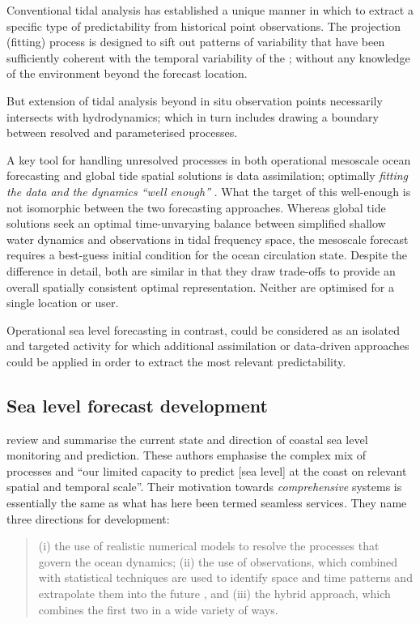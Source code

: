 Conventional tidal analysis has established a unique manner in which to extract a specific type of predictability from historical point observations.
The projection (fitting) process is designed to sift out patterns of variability that have been sufficiently coherent with the temporal variability of the \ATGP{}; without any knowledge of the environment beyond the forecast location.

But extension of tidal analysis beyond in situ observation points necessarily intersects with hydrodynamics; which in turn includes drawing a boundary between resolved and parameterised processes.  

A key tool for handling unresolved processes in both operational mesoscale ocean forecasting and global tide spatial solutions is data assimilation; optimally \textit{fitting the data and the dynamics ``well enough''} \citep{Egbert:1994wz}. 
What the target of this well-enough is not isomorphic between the two forecasting approaches.
Whereas global tide solutions seek an optimal time-unvarying balance between simplified shallow water dynamics and observations in tidal frequency space, the mesoscale forecast requires a best-guess initial condition for the ocean circulation state.  
Despite the difference in detail, both are similar in that they draw trade-offs to provide an overall spatially consistent optimal representation.   Neither are optimised for a single location or user.

Operational sea level forecasting in contrast, could be considered as an isolated and targeted activity for which additional assimilation or data-driven approaches could be applied in order to extract the most relevant predictability. 

\subsection{Sea level forecast development}
\citep{10.3389/fmars.2019.00437} review and summarise the current state and direction of coastal sea level monitoring and prediction.   These authors emphasise the complex mix of processes and ``our limited capacity to predict [sea level] at the coast on relevant spatial and temporal scale''.
Their motivation towards \emph{comprehensive} systems is essentially the same as what has here been termed seamless services. 
They name three directions for development:
\begin{quote}
(i) the use of realistic numerical models to resolve the processes that govern the ocean dynamics; (ii) the use of observations, which combined with statistical techniques are used to identify space and time patterns and extrapolate them into the future , and (iii) the hybrid approach, which combines the first two in a wide variety of ways.
\end{quote} 

